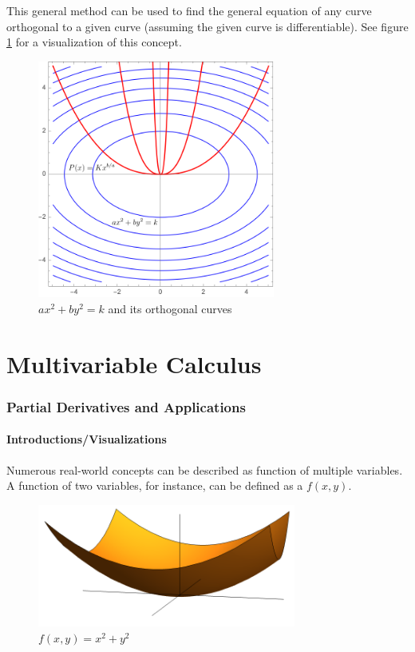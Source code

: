 \documentclass[12pt]{article}
\begin{document}
This general method can be used to find the general equation of any curve orthogonal to a given curve (assuming the given curve is differentiable). See figure \ref{fig:orthogonalcurves} for a visualization of this concept.

\begin{figure}[!ht]
    \centering
    \includegraphics[width=7.8cm]{misc/orthogonalcurves.png}
    \caption{$ax^2+by^2=k$ and its orthogonal curves}
    \label{fig:orthogonalcurves}
\end{figure}

\part{Multivariable Calculus}
\section{Partial Derivatives and Applications}

\subsection{Introductions/Visualizations}

Numerous real-world concepts can be described as function of multiple variables. A function of two variables, for instance, can be defined as a $f(x,y)$. 

\begin{figure}[!ht]
    \centering
    \includegraphics[width=8.5cm]{misc/xsquaredysquared.png}
    \caption{$f(x,y)=x^2+y^2$}
    \label{fig:2dfunction}
\end{figure}
\end{document}
